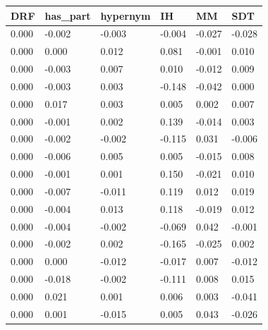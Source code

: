 \begin{longtable}{llllll}
\hline
\textbf{DRF} & \textbf{has\_part} & \textbf{hypernym} & \textbf{IH} & \textbf{MM} & \textbf{SDT} \\ \hline
0.000        & -0.002             & -0.003            & -0.004      & -0.027      & -0.028       \\
0.000        & 0.000              & 0.012             & 0.081       & -0.001      & 0.010        \\
0.000        & -0.003             & 0.007             & 0.010       & -0.012      & 0.009        \\
0.000        & -0.003             & 0.003             & -0.148      & -0.042      & 0.000        \\
0.000        & 0.017              & 0.003             & 0.005       & 0.002       & 0.007        \\
0.000        & -0.001             & 0.002             & 0.139       & -0.014      & 0.003        \\
0.000        & -0.002             & -0.002            & -0.115      & 0.031       & -0.006       \\
0.000        & -0.006             & 0.005             & 0.005       & -0.015      & 0.008        \\
0.000        & -0.001             & 0.001             & 0.150       & -0.021      & 0.010        \\
0.000        & -0.007             & -0.011            & 0.119       & 0.012       & 0.019        \\
0.000        & -0.004             & 0.013             & 0.118       & -0.019      & 0.012        \\
0.000        & -0.004             & -0.002            & -0.069      & 0.042       & -0.001       \\
0.000        & -0.002             & 0.002             & -0.165      & -0.025      & 0.002        \\
0.000        & 0.000              & -0.012            & -0.017      & 0.007       & -0.012       \\
0.000        & -0.018             & -0.002            & -0.111      & 0.008       & 0.015        \\
0.000        & 0.021              & 0.001             & 0.006       & 0.003       & -0.041       \\
0.000        & 0.001              & -0.015            & 0.005       & 0.043       & -0.026       \\

\end{longtable}
